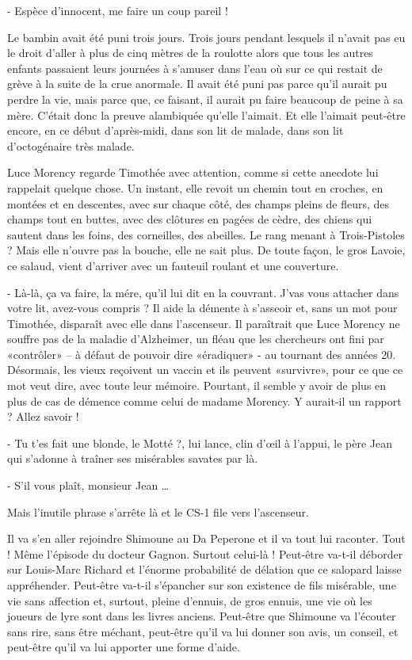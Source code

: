 - Espèce d’innocent, me faire un coup pareil !

Le bambin avait été puni trois jours. Trois jours pendant lesquels il n’avait pas eu le droit d’aller à plus de cinq mètres de la roulotte alors que tous les autres enfants passaient leurs journées à s’amuser dans l’eau où sur ce qui restait de grève à la suite de la crue anormale. Il avait été puni pas parce qu’il aurait pu perdre la vie, mais parce que, ce faisant, il aurait pu faire beaucoup de peine à sa mère. C’était donc la preuve alambiquée qu’elle l’aimait. Et elle l’aimait peut-être encore, en ce début d’après-midi, dans son lit de malade, dans son lit d’octogénaire très malade.

Luce Morency regarde Timothée avec attention, comme si cette anecdote lui rappelait quelque chose. Un instant, elle revoit un chemin tout en croches, en montées et en descentes, avec sur chaque côté, des champs pleins de fleurs, des champs tout en buttes, avec des clôtures en pagées de cèdre, des chiens qui sautent dans les foins, des corneilles, des abeilles. Le rang menant à Trois-Pistoles ? Mais elle n’ouvre pas la bouche, elle ne sait plus. De toute façon, le gros Lavoie, ce salaud, vient d’arriver avec un fauteuil roulant et une couverture.

- Là-là, ça va faire, la mére, qu’il lui dit en la couvrant. J’vas vous attacher dans votre lit, avez-vous compris ?
Il aide la démente à s’asseoir et, sans un mot pour Timothée, disparaît avec elle dans l’ascenseur. Il paraîtrait que Luce Morency ne souffre pas de la maladie d’Alzheimer, un fléau que les chercheurs ont fini par «contrôler» – à défaut de pouvoir dire «éradiquer» - au tournant des années 20. Désormais, les vieux reçoivent un vaccin et ils peuvent «survivre», pour ce que ce mot veut dire, avec toute leur mémoire. Pourtant, il semble y avoir de plus en plus de cas de démence comme celui de madame Morency. Y aurait-il un rapport ? Allez savoir !

- Tu t’es fait une blonde, le Motté ?, lui lance, clin d’œil à l’appui, le père Jean qui s’adonne à traîner ses misérables savates par là.

- S’il vous plaît, monsieur Jean …

Mais l’inutile phrase s’arrête là et le CS-1 file vers l’ascenseur.

Il va s’en aller rejoindre Shimoune au Da Peperone et il va tout lui raconter. Tout ! Même l’épisode du docteur Gagnon. Surtout celui-là ! Peut-être va-t-il déborder sur Louis-Marc Richard et l’énorme probabilité de délation que ce salopard laisse appréhender. Peut-être va-t-il s’épancher sur son existence de fils misérable, une vie sans affection et, surtout, pleine d’ennuis, de gros ennuis, une vie où les joueurs de lyre sont dans les livres anciens. Peut-être que Shimoune va l’écouter sans rire, sans être méchant, peut-être qu’il va lui donner son avis, un conseil, et peut-être qu’il va lui apporter une forme d’aide.


